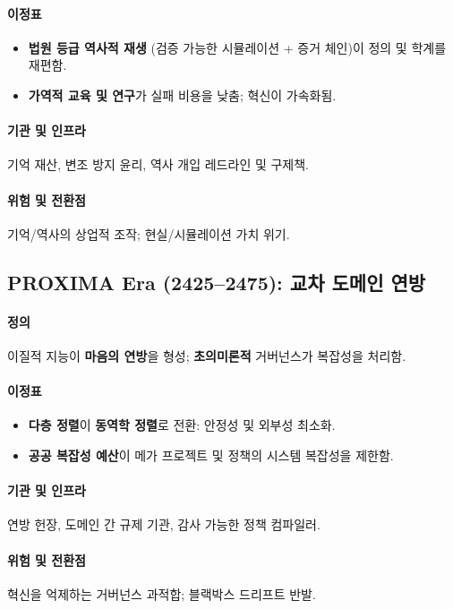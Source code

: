 \documentclass[11pt]{article}
\begin{document}
\paragraph{이정표}
\begin{itemize}[noitemsep]
  \item \textbf{법원 등급 역사적 재생} (검증 가능한 시뮬레이션 + 증거 체인)이 정의 및 학계를 재편함.
  \item \textbf{가역적 교육 및 연구}가 실패 비용을 낮춤; 혁신이 가속화됨.
\end{itemize}

\paragraph{기관 및 인프라} 기억 재산, 변조 방지 윤리, 역사 개입 레드라인 및 구제책.

\paragraph{위험 및 전환점} 기억/역사의 상업적 조작; 현실/시뮬레이션 가치 위기.

\subsection{PROXIMA Era (2425–2475): 교차 도메인 연방}
\paragraph{정의} 이질적 지능이 \textbf{마음의 연방}을 형성; \textbf{초의미론적} 거버넌스가 복잡성을 처리함.

\paragraph{이정표}
\begin{itemize}[noitemsep]
  \item \textbf{다층 정렬}이 \textbf{동역학 정렬}로 전환: 안정성 및 외부성 최소화.
  \item \textbf{공공 복잡성 예산}이 메가 프로젝트 및 정책의 시스템 복잡성을 제한함.
\end{itemize}

\paragraph{기관 및 인프라} 연방 헌장, 도메인 간 규제 기관, 감사 가능한 정책 컴파일러.

\paragraph{위험 및 전환점} 혁신을 억제하는 거버넌스 과적합; 블랙박스 드리프트 반발.
\end{document}
